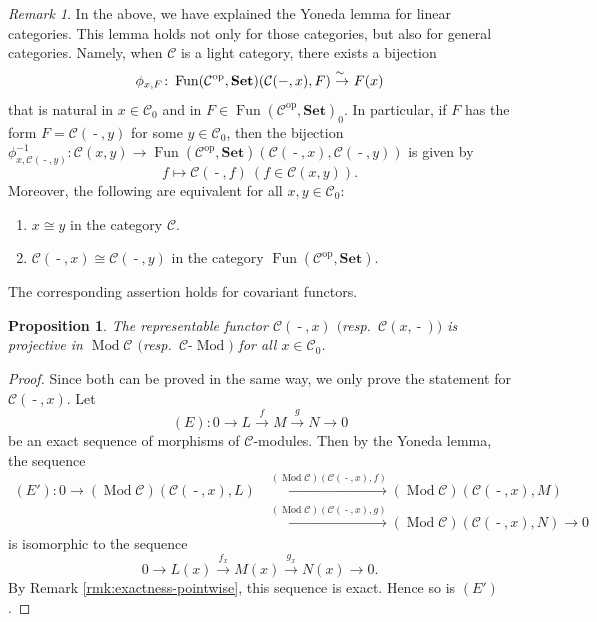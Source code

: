 \documentclass{surv-l}
\numberwithin{equation}{chapter}
\numberwithin{figure}{chapter}
\theoremstyle{plain}
\newtheorem{prp}[thm]{Proposition}
\theoremstyle{definition}
\theoremstyle{remark}
\newtheorem{rmk}[thm]{Remark}
\newcommand{\isoto}{\
  \raise.8ex\hbox{$^{\sim}$}\kern-.7em\hbox{$\to$}\ }
\DeclareMathOperator{\Mod}{Mod}
\DeclareMathOperator{\blank}{-}
\DeclareMathOperator{\Fun}{Fun}
\begin{document}
\begin{rmk}\label{rmk:Yoneda-lem}
In the above, we have explained the Yoneda lemma for linear categories.
This lemma holds not only for those categories, but also for general categories.
Namely, when
${\mathcal{C}}$ is a light category, there exists a bijection
\[
\phi_{x,F} \colon \Fun({\mathcal{C}}^{\mathrm{op}}, \mathbf{Set})({\mathcal{C}}(\blank, x), F) \isoto F(x)
\]
that is natural in $x \in {\mathcal{C}}_0$ and in $F \in \Fun({\mathcal{C}}^{\mathrm{op}}, \mathbf{Set})_0$.
In particular, if $F$ has the form $F = {\mathcal{C}}(\blank, y)$ for some $y \in {\mathcal{C}}_0$,
then the bijection
$\phi^{-1}_{x, {\mathcal{C}}(\blank, y)} \colon {\mathcal{C}}(x, y) \to \Fun({\mathcal{C}}^{\mathrm{op}}, \mathbf{Set})({\mathcal{C}}(\blank, x), {\mathcal{C}}(\blank, y))$
is given by
\[
f \mapsto {\mathcal{C}}(\blank, f)\ (f \in {\mathcal{C}}(x,y)).
\]
Moreover, the following are equivalent for all $x, y \in {\mathcal{C}}_0$:
\begin{enumerate}
\item
$x \cong y$ in the category ${\mathcal{C}}$.
\item
${\mathcal{C}}(\blank, x) \cong {\mathcal{C}}(\blank, y)$ in the category $\Fun({\mathcal{C}}^{\mathrm{op}}, \mathbf{Set})$.
\end{enumerate}
The corresponding assertion holds for covariant functors.
\end{rmk}

\begin{prp}
The representable functor
${\mathcal{C}}(\blank, x)$ $($resp.\ ${\mathcal{C}}(x, \blank))$ is projective
in $\Mod {\mathcal{C}}$ $($resp.\ ${\mathcal{C}}\!\text{-}\!\Mod)$
for all $x \in {\mathcal{C}}_0$.
\end{prp}

\begin{proof}
Since both can be proved in the same way, we only prove the statement for
${\mathcal{C}}(\blank, x)$.
Let
\[
(E) : 0 \to L \xrightarrow{f} M \xrightarrow{g} N \to 0
\]
be an exact sequence of morphisms of \({\mathcal{C}}\)-modules.
Then by the Yoneda lemma, the sequence
\begin{equation*}
\begin{aligned}(E') :
0 \to (\Mod{\mathcal{C}})({\mathcal{C}}(\blank, x), L) &\xrightarrow{(\Mod{\mathcal{C}})({\mathcal{C}}(\blank, x), f)} (\Mod{\mathcal{C}})({\mathcal{C}}(\blank, x), M)\\
 &\xrightarrow{(\Mod{\mathcal{C}})({\mathcal{C}}(\blank, x), g)} (\Mod{\mathcal{C}})({\mathcal{C}}(\blank, x), N) \to 0
\end{aligned}
\end{equation*}
is isomorphic to the sequence
\[
0 \to L(x) \xrightarrow{f_x} M(x) \xrightarrow{g_x} N(x) \to 0.
\]
By Remark \ref{rmk:exactness-pointwise}, this sequence is exact.
Hence so is $(E')$.
\end{proof}
\end{document}
